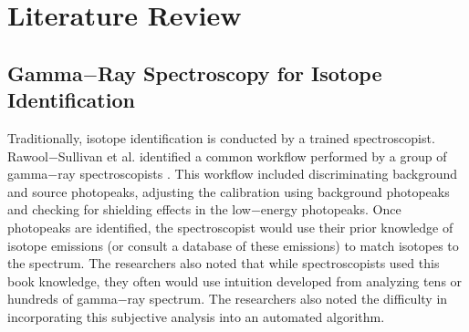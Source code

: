\documentclass[tocnosub,noragright,centerchapter,12pt,fullpage]{uiucecethesis09}
\begin{document}















\chapter{Literature Review}


\section{Gamma$-$Ray Spectroscopy for Isotope Identification}

Traditionally, isotope identification is conducted by a trained spectroscopist. Rawool$-$Sullivan et al. identified a common workflow performed by a group of gamma$-$ray spectroscopists \cite{Sullivan2010}. This workflow included discriminating background and source photopeaks, adjusting the calibration using background photopeaks and checking for shielding effects in the low$-$energy photopeaks. Once photopeaks are identified, the spectroscopist would use their prior knowledge of isotope emissions (or consult a database of these emissions) to match isotopes to the spectrum. The researchers also noted that while  spectroscopists used this book knowledge, they often would use intuition developed from analyzing tens or hundreds of gamma$-$ray spectrum. The researchers also noted the difficulty in incorporating this subjective analysis into an automated algorithm.
\end{document}
